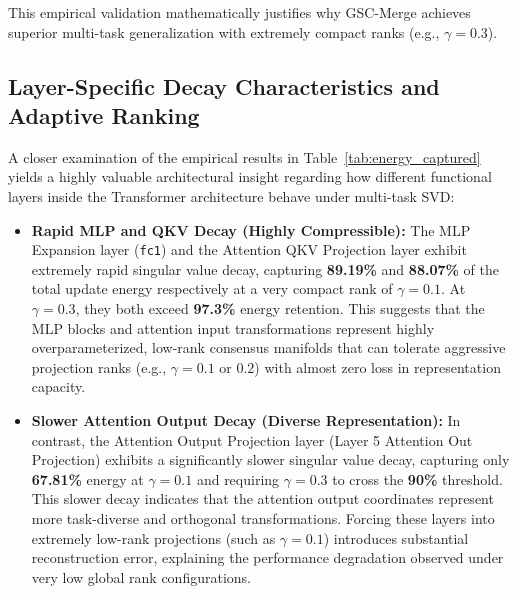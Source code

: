 \documentclass{article}
\theoremstyle{plain}
\theoremstyle{definition}
\theoremstyle{remark}
\begin{document}
This empirical validation mathematically justifies why GSC-Merge achieves superior multi-task generalization with extremely compact ranks (e.g., $\gamma = 0.3$).

\subsection{Layer-Specific Decay Characteristics and Adaptive Ranking}
\label{subsec:layer_specific_decay}

A closer examination of the empirical results in Table~\ref{tab:energy_captured} yields a highly valuable architectural insight regarding how different functional layers inside the Transformer architecture behave under multi-task SVD:
\begin{itemize}
    \item \textbf{Rapid MLP and QKV Decay (Highly Compressible):} The MLP Expansion layer (\texttt{fc1}) and the Attention QKV Projection layer exhibit extremely rapid singular value decay, capturing \textbf{89.19\%} and \textbf{88.07\%} of the total update energy respectively at a very compact rank of $\gamma = 0.1$. At $\gamma = 0.3$, they both exceed \textbf{97.3\%} energy retention. This suggests that the MLP blocks and attention input transformations represent highly overparameterized, low-rank consensus manifolds that can tolerate aggressive projection ranks (e.g., $\gamma = 0.1$ or $0.2$) with almost zero loss in representation capacity.
    \item \textbf{Slower Attention Output Decay (Diverse Representation):} In contrast, the Attention Output Projection layer (Layer 5 Attention Out Projection) exhibits a significantly slower singular value decay, capturing only \textbf{67.81\%} energy at $\gamma = 0.1$ and requiring $\gamma = 0.3$ to cross the \textbf{90\%} threshold. This slower decay indicates that the attention output coordinates represent more task-diverse and orthogonal transformations. Forcing these layers into extremely low-rank projections (such as $\gamma = 0.1$) introduces substantial reconstruction error, explaining the performance degradation observed under very low global rank configurations.
\end{itemize}
\end{document}
